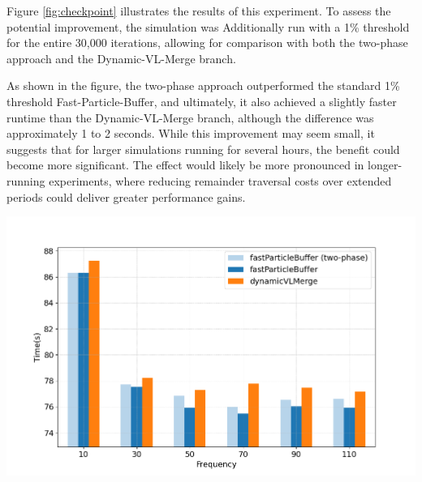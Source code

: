 Figure \ref{fig:checkpoint} illustrates the results of this experiment. To assess the potential improvement, the simulation was Additionally run with a 1\% threshold for the entire 30,000 iterations, allowing for comparison with both the two-phase approach and the Dynamic-VL-Merge branch.  

As shown in the figure, the two-phase approach outperformed the standard 1\% threshold Fast-Particle-Buffer, and ultimately, it also achieved a slightly faster runtime than the Dynamic-VL-Merge branch, although the difference was approximately 1 to 2 seconds. While this improvement may seem small, it suggests that for larger simulations running for several hours, the benefit could become more significant. The effect would likely be more pronounced in longer-running experiments, where reducing remainder traversal costs over extended periods could deliver greater performance gains.

\begin{center}
    \includegraphics[width=0.8\linewidth]{graphs/checkpoint.png}
    \captionsetup{hypcap=false}
    \label{fig:checkpoint}
\end{center}




